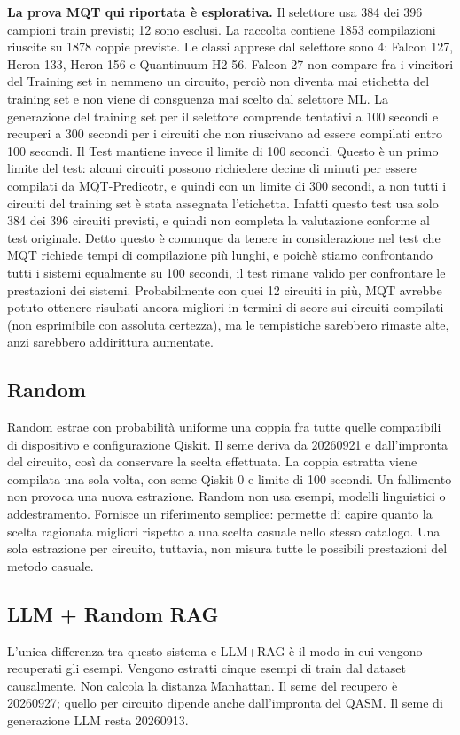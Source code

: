 \textbf{La prova MQT qui riportata è esplorativa.} Il selettore usa 384 dei 396 campioni train
previsti; 12 sono esclusi. La raccolta contiene 1853 compilazioni riuscite su 1878 coppie previste. Le
classi apprese dal selettore sono 4: Falcon 127, Heron 133, Heron 156 e Quantinuum H2-56. Falcon 27
non compare fra i vincitori del Training set in nemmeno un circuito, perciò non diventa mai etichetta
del training set e non viene di consguenza mai scelto dal selettore ML. La generazione del training set
per il selettore comprende tentativi a 100 secondi e recuperi a 300 secondi per i circuiti che non riuscivano ad essere compilati entro 100 secondi. Il Test mantiene invece il limite di 100 secondi. Questo
è un primo limite del test: alcuni circuiti possono richiedere decine di minuti per essere compilati da
MQT-Predicotr, e quindi con un limite di 300 secondi, a non tutti i circuiti del training set è stata
assegnata l’etichetta. Infatti questo test usa solo 384 dei 396 circuiti previsti, e quindi non completa
la valutazione conforme al test originale. Detto questo è comunque da tenere in considerazione nel
test che MQT richiede tempi di compilazione più lunghi, e poichè stiamo confrontando tutti i sistemi
equalmente su 100 secondi, il test rimane valido per confrontare le prestazioni dei sistemi. Probabilmente con quei 12 circuiti in più, MQT avrebbe potuto ottenere risultati ancora migliori in termini
di score sui circuiti compilati (non esprimibile con assoluta certezza), ma le tempistiche sarebbero
rimaste alte, anzi sarebbero addirittura aumentate.

\subsection{Random}
Random estrae con probabilità uniforme una coppia fra tutte quelle compatibili di dispositivo e configurazione Qiskit. Il seme deriva da 20260921 e dall’impronta del circuito, così da conservare la scelta
effettuata. La coppia estratta viene compilata una sola volta, con seme Qiskit 0 e limite di 100 secondi.
Un fallimento non provoca una nuova estrazione.
Random non usa esempi, modelli linguistici o addestramento. Fornisce un riferimento semplice:
permette di capire quanto la scelta ragionata migliori rispetto a una scelta casuale nello stesso catalogo.
Una sola estrazione per circuito, tuttavia, non misura tutte le possibili prestazioni del metodo casuale.



\subsection{LLM + Random RAG}
L'unica differenza tra questo sistema e LLM+RAG è il modo in cui vengono recuperati gli esempi. Vengono estratti cinque
esempi di train dal dataset causalmente. Non calcola la distanza Manhattan. Il seme del recupero è 20260927; quello per circuito
dipende anche dall'impronta del QASM. Il seme di generazione LLM resta 20260913.

